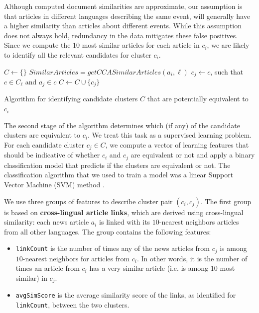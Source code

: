 \documentclass[twoside,11pt]{article}
\begin{document}
Although computed document similarities are approximate, our  assumption is that articles in different languages describing the same event, will generally have a higher similarity than articles about different events. While this assumption does not always hold, redundancy in the data mitigates these false positives. Since we compute the 10 most similar articles for each article in $c_i$, we are likely to identify all the relevant candidates for cluster $c_i$.

\begin{algorithm}[t!]
$C \leftarrow \{\}$\;
 {
     {
        $SimilarArticles = getCCASimilarArticles(a_i, \ell)$\;
         {
            $c_j \leftarrow c$, such that $c \in C_\ell$ and $a_j \in c$\;
            $C \leftarrow C \cup \{ c_j \}$\;
        }
    }
}
\caption{Algorithm for identifying candidate clusters $C$ that are potentially equivalent to $c_i$}
\label{cluster_merge_algo1}
\end{algorithm}

The second stage of the algorithm determines which (if any) of the candidate clusters are equivalent to $c_i$. We treat this task as a supervised learning problem. For each candidate cluster $c_j \in C$, we compute a vector of learning features that should be indicative of whether $c_i$ and $c_j$ are equivalent or not and apply a binary classification model that predicts if the clusters are equivalent or not. The classification algorithm that we used to train a model was a linear Support Vector Machine (SVM) method .

We use three groups of features to describe cluster pair $(c_i, c_j)$. The first group is based on {\bf cross-lingual article links}, which are derived using cross-lingual similarity: each news article $a_i$ is linked with its $10$-nearest neighbors articles from all other languages. The group contains the following features:

\begin{itemize}
\item \texttt{linkCount} is the number of times any of the news articles from $c_j$ is among $10$-nearest neighbors for articles from $c_i$. In other words, it is the number of times an article from $c_i$ has a very similar article (i.e. is among 10 most similar) in $c_j$.
\item \texttt{avgSimScore} is the average similarity score of the links, as identified for \texttt{linkCount}, between the two clusters.
\end{itemize}
\end{document}
